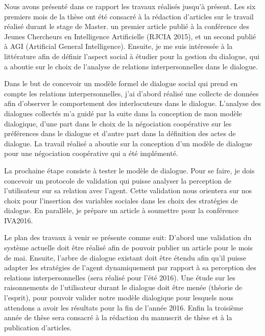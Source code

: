 \documentclass[a4paper,french]{article}
\begin{document}
Nous avons présenté dans ce rapport les travaux réalisés jusqu'à présent. Les six premiers mois de la thèse ont été consacré à la rédaction d'articles sur le travail réalisé durant le stage de Master. un premier article \cite{ouali2015reparation} publié à la conférence des Jeunes Chercheurs en Intelligence Artificielle (RJCIA 2015), et un second \cite{ouali2015plan} publié à AGI (Artificial General Intelligence). Ensuite, je me suis intéressée à la littérature afin de définir l'aspect social à étudier pour la gestion du dialogue, qui a aboutie sur le choix de l'analyse de relations interpersonnelles dans le dialogue. 

\par Dans le but de concevoir un modèle formel de dialogue social qui prend en compte les relations interpersonnelles, j'ai d'abord réalisé une collecte de données afin d’observer le comportement des interlocuteurs dans le dialogue. L'analyse des dialogues collectés m'a guidé par la suite dans la conception de mon modèle dialogique, d'une part dans le choix de la négociation coopérative sur les préférences dans le dialogue et d'autre part dans la définition des actes de dialogue.  La travail réalisé a aboutie sur la conception d'un modèle de dialogue pour une négociation coopérative qui a été implémenté. 

\par La prochaine étape consiste à tester le modèle de dialogue. Pour se faire, je dois concevoir un protocole de validation qui puisse analyser la perception de l'utilisateur sur sa relation avec l'agent. Cette validation nous orientera sur nos choix pour l'insertion des variables sociales dans les choix des stratégies de dialogue. En parallèle, je prépare un article à soumettre pour la conférence IVA2016. 

\par Le plan des travaux à venir se présente comme suit: D'abord une validation du système actuelle doit être réalisé afin de pouvoir publier un article pour le mois de mai. 
Ensuite, l'arbre de dialogue existant doit être étendu afin qu'il puisse adapter les stratégies de l'agent dynamiquement par rapport à sa perception des relations interpersonnelles (sera réalisé pour l'été 2016). Une étude sur les raisonnements de l'utilisateur durant le dialogue doit être menée (théorie de l'esprit), pour pouvoir valider notre modèle dialogique pour lesquels nous attendons a avoir les résultats pour la fin de l'année 2016.
Enfin la troisième année de thèse sera consacré à la rédaction du manuscrit de thèse et à la publication d'articles.


	\vskip 4pt
	
	{\footnotesize
			} %
	
\end{document}

